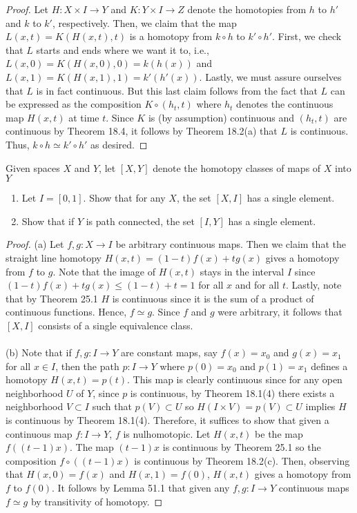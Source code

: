 \begin{proof}
Let $H\colon X\times I\to Y$ and $K\colon Y\times I\to Z$ denote
the homotopies from $h$ to $h'$ and $k$ to $k'$,
respectively. Then, we claim that the map $L(x,t)=K(H(x,t),t)$ is
a homotopy from $k\circ h$ to $k'\circ h'$. First, we check that
$L$ starts and ends where we want it to, i.e.,
$L(x,0)=K(H(x,0),0)=k(h(x))$ and
$L(x,1)=K(H(x,1),1)=k'(h'(x))$. Lastly, we must assure ourselves
that $L$ is in fact continuous. But this last claim follows from
the fact that $L$ can be expressed as the composition $K\circ
(h_t,t)$ where $h_t$ denotes the continuous map $H(x,t)$ at time
$t$. Since $K$ is (by assumption) continuous and $(h_t,t)$ are
continuous by Theorem 18.4, it follows by Theorem 18.2(a) that
$L$ is continuous. Thus, $k\circ h\simeq k'\circ h'$ as desired.
\end{proof}
\newpage
\begin{problem}[Munkres \S51, Ex.\,2]
Given spaces $X$ and $Y$, let $[X,Y]$ denote the homotopy classes
of maps of $X$ into $Y$
\begin{enumerate}[label=(\alph*)]
\item Let $I=[0,1]$. Show that for any $X$, the set $[X,I]$ has a
  single element.
\item Show that if $Y$ is path connected, the set $[I,Y]$ has a
  single element.
\end{enumerate}
\end{problem}
\begin{proof}
(a) Let $f,g\colon X\to I$ be arbitrary continuous maps. Then we
claim that the straight line homotopy $H(x,t)=(1-t)f(x)+tg(x)$
gives a homotopy from $f$ to $g$. Note that the image of $H(x,t)$
stays in the interval $I$ since $(1-t)f(x)+tg(x)\leq (1-t)+t=1$
for all $x$ and for all $t$. Lastly, note that by Theorem 25.1
$H$ is continuous since it is the sum of a product of continuous
functions. Hence, $f\simeq g$. Since $f$ and $g$ were arbitrary,
it follows that $[X,I]$ consists of a single equivalence class.
\\\\
(b) Note that if $f,g\colon I\to Y$ are constant maps, say $f(x)=x_0$ and
$g(x)=x_1$ for all $x\in I$, then the path $p\colon I\to Y$ where
$p(0)=x_0$ and $p(1)=x_1$ defines a homotopy $H(x,t)=p(t)$. This map is
clearly continuous since for any open neighborhood $U$ of $Y$, since $p$ is
continuous, by Theorem 18.1(4) there exists a neighborhood $V\subset I$
such that $p(V)\subset U$ so $H(I\times V)=p(V)\subset U$ implies $H$ is
continuous by Theorem 18.1(4). Therefore, it suffices to show that given a
continuous map $f\colon I\to Y$, $f$ is nulhomotopic. Let $H(x,t)$ be the
map $f((t-1)x)$. The map $(t-1)x$ is continuous by Theorem 25.1 so the
composition $f\circ((t-1)x)$ is continuous by Theorem 18.2(c). Then,
observing that $H(x,0)=f(x)$ and $H(x,1)=f(0)$, $H(x,t)$ gives a homotopy
from $f$ to $f(0)$. It follows by Lemma 51.1 that given any $f,g\colon I\to
Y$ continuous maps $f\simeq g$ by transitivity of homotopy.
\end{proof}
